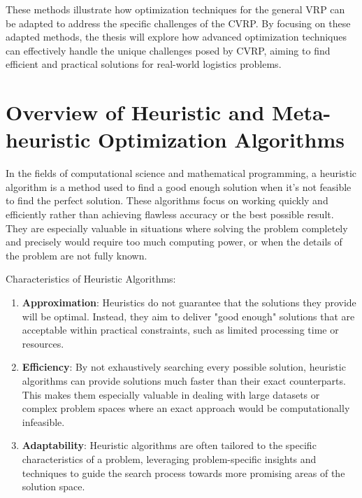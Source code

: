 \documentclass[
]{article}
\begin{document}
    These methods illustrate how optimization techniques for the general VRP can be adapted to address the specific challenges of the CVRP. By focusing on these adapted methods, the thesis will explore how advanced optimization techniques can effectively handle the unique challenges posed by CVRP, aiming to find efficient and practical solutions for real-world logistics problems.

    \hypertarget{overview-of-heuristic-and-meta-heuristic-optimization-algorithms}{%


        \section{Overview of Heuristic and Meta-heuristic Optimization Algorithms}\label{overview-of-heuristic-and-meta-heuristic-optimization-algorithms}}



    In the fields of computational science and mathematical programming, a heuristic algorithm is a method used to find a good enough solution when it's not feasible to find the perfect solution. These algorithms focus on working quickly and efficiently rather than achieving flawless accuracy or the best possible result. They are especially valuable in situations where solving the problem completely and precisely would require too much computing power, or when the details of the problem are not fully known.

    Characteristics of Heuristic Algorithms:
    \begin{enumerate}
        \item \textbf{Approximation}: Heuristics do not guarantee that the solutions they provide will be optimal. Instead, they aim to deliver "good enough" solutions that are acceptable within practical constraints, such as limited processing time or resources.
        \item \textbf{Efficiency}: By not exhaustively searching every possible solution, heuristic algorithms can provide solutions much faster than their exact counterparts. This makes them especially valuable in dealing with large datasets or complex problem spaces where an exact approach would be computationally infeasible.
        \item \textbf{Adaptability}: Heuristic algorithms are often tailored to the specific characteristics of a problem, leveraging problem-specific insights and techniques to guide the search process towards more promising areas of the solution space.
    \end{enumerate}
\end{document}

